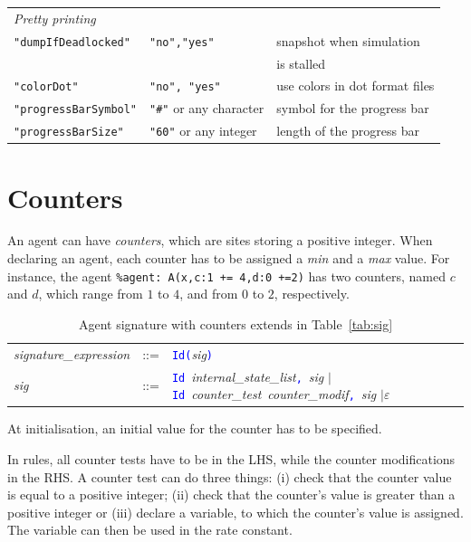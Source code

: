 \documentclass[11pt]{book}
\def\tcb#1{\textcolor{blue}{\ttt{#1}}}
\def\ttt#1{\texttt{#1}}
\begin{document}
\begin{table}[ht]
\begin{tabular}{l|l|l}
\textit{Pretty printing}& &\\
\ttt{"dumpIfDeadlocked"} & \ttt{"no","yes"} & \small snapshot when simulation \\&&\small is stalled\\
\ttt{"colorDot"} &  \ttt{"no", "yes"} & \small use colors in dot format files\\
\ttt{"progressBarSymbol"} & \ttt{"\#"} or any character & \small symbol for the progress bar\\
\ttt{"progressBarSize"} & \ttt{"60"} or any integer & \small length of the progress bar\\
\end{tabular}
\label{tab:parameters}
\end{table}

\section{Counters}

An agent can have \emph{counters}, which are sites storing a positive integer. When declaring an agent, each counter has to be assigned a \emph{min} and a \emph{max} value.
For instance, the agent \ttt{\%agent: A(x,c:1 += 4,d:0 +=2)} has two counters, named $c$ and $d$, which range from $1$ to $4$, and from $0$ to $2$, respectively.

\begin{table}[htbp]
  \centering
  \caption{Agent signature with counters extends in Table~\ref{tab:sig}}
  \begin{tabular}{@{} lcl @{}}
    \textit{signature\_expression} & ::= &
    \tcb{Id}\tcb{(}\textit{sig}\tcb{)} \\

    \textit{sig} & ::= &
    \tcb{Id}~\textit{internal\_state\_list}\tcb{,}\ \textit{sig} $\mid$ \tcb{Id}~\textit{counter\_test}~\textit{counter\_modif}\tcb{,}\ \textit{sig}
    $\mid\varepsilon$ \\
 \end{tabular}
\end{table}

At initialisation, an initial value for the counter has to be specified.

In rules, all counter tests have to be in the LHS, while the counter modifications in the RHS.
A counter test can do three things: (i) check that the counter value is equal to a positive integer; (ii) check that the counter's value is greater than a positive integer or (iii) declare a variable, to which the counter's value is assigned. The variable can then be used in the rate constant.
\end{document}
